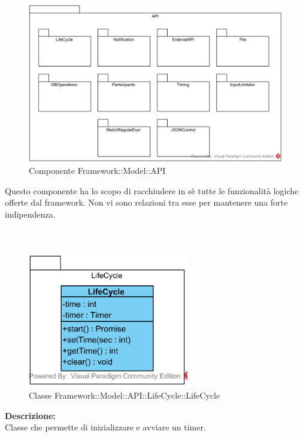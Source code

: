 \paragraph{\class}\mbox{}\\ \label{\class}
\begin{figure}[H]
	\centering
	\includegraphics[width=15cm]{./diagrammi/framework/model/api.png}
	\caption{Componente Framework::Model::API}
\end{figure}
Questo componente ha lo scopo di racchiudere in sè tutte le funzionalità logiche offerte dal framework. Non vi sono relazioni tra esse per mantenere una forte indipendenza.

\subparagraph{\class}\mbox{}\\ \label{\class}
\begin{figure}[H]
	\centering
	\includegraphics[width=7cm]{./diagrammi/framework/model/api/lifecycle.png}
	\caption{Classe Framework::Model::API::LifeCycle::LifeCycle}
\end{figure}

\textbf{Descrizione:}\\
Classe che permette di inizializzare e avviare un timer.

